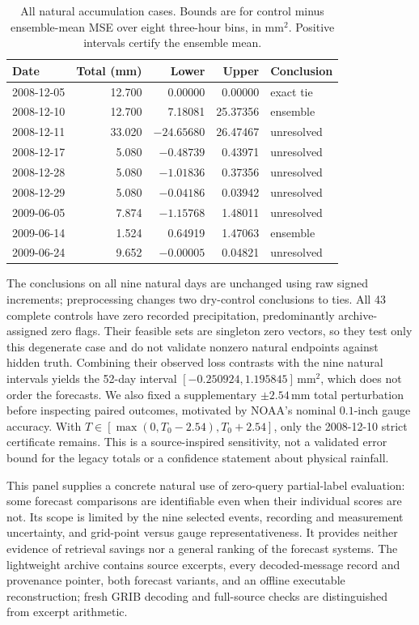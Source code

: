 \begin{table}[t]
\centering
\caption{All natural accumulation cases. Bounds are for control minus
ensemble-mean MSE over eight three-hour bins, in $\mathrm{mm}^2$.
Positive intervals certify the ensemble mean.}
\label{tab:noaa-natural}
\begin{tabular}{lrrrl}
\hline
Date & Total (mm) & Lower & Upper & Conclusion\\
\hline
2008-12-05 & 12.700 & 0.00000 & 0.00000 & exact tie\\
2008-12-10 & 12.700 & 7.18081 & 25.37356 & ensemble\\
2008-12-11 & 33.020 & $-24.65680$ & 26.47467 & unresolved\\
2008-12-17 & 5.080 & $-0.48739$ & 0.43971 & unresolved\\
2008-12-28 & 5.080 & $-1.01836$ & 0.37356 & unresolved\\
2008-12-29 & 5.080 & $-0.04186$ & 0.03942 & unresolved\\
2009-06-05 & 7.874 & $-1.15768$ & 1.48011 & unresolved\\
2009-06-14 & 1.524 & 0.64919 & 1.47063 & ensemble\\
2009-06-24 & 9.652 & $-0.00005$ & 0.04821 & unresolved\\
\hline
\end{tabular}
\end{table}

The conclusions on all nine natural days are unchanged using raw signed
increments; preprocessing changes two dry-control conclusions to ties.
All 43 complete controls have zero recorded precipitation, predominantly
archive-assigned zero flags. Their feasible sets are singleton zero vectors,
so they test only this degenerate case and do not validate nonzero natural
endpoints against hidden truth. Combining their observed loss contrasts with
the nine natural intervals yields the 52-day interval
$[-0.250924,1.195845]\,\mathrm{mm}^2$, which does not order the forecasts.
We also fixed a supplementary $\pm2.54$\,mm total perturbation before inspecting
paired outcomes, motivated by NOAA's nominal $0.1$-inch gauge accuracy.
With $T\in[\max(0,T_0-2.54),T_0+2.54]$, only the 2008-12-10 strict certificate
remains. This is a source-inspired sensitivity, not a validated error bound
for the legacy totals or a confidence statement about physical rainfall.

This panel supplies a concrete natural use of zero-query partial-label
evaluation: some forecast comparisons are identifiable even when their
individual scores are not. Its scope is limited by the nine selected events,
recording and measurement uncertainty, and grid-point versus gauge
representativeness. It provides neither evidence of retrieval savings nor
a general ranking of the forecast systems. The lightweight archive contains
source excerpts, every decoded-message record and provenance pointer, both
forecast variants, and an offline executable reconstruction; fresh GRIB
decoding and full-source checks are distinguished from excerpt arithmetic.
